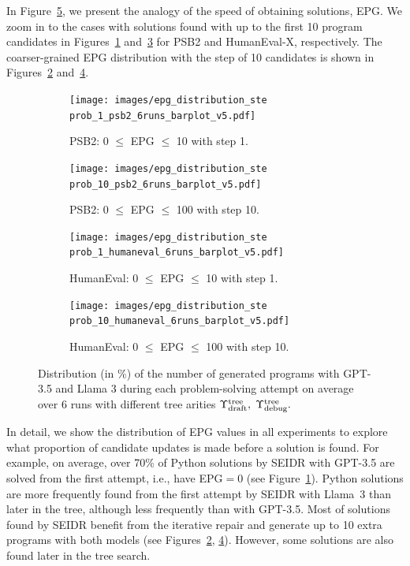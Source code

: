 In Figure~\ref{fig:epg-distribution}, we present the analogy of the speed of obtaining solutions, EPG. 
We zoom in to the cases with solutions found with up to the first 10 program candidates in Figures~\ref{fig:psb2-epg-distrib-step-1} and~\ref{fig:humaneval-epg-distrib-step-1} for PSB2 and HumanEval-X, respectively. 
The coarser-grained EPG distribution with the step of 10 candidates is shown in Figures~\ref{fig:psb2-epg-distrib-step-10} and~\ref{fig:humaneval-epg-distrib-step-10}. 


\begin{figure}
\begin{subfigure}{\columnwidth}
\centering
\texttt{[image: images/epg\_distribution\_ste\\prob\_1\_psb2\_6runs\_barplot\_v5.pdf]}
  \caption{PSB2: 0 $\leq$ EPG $\leq$ 10 with step 1.}
  \label{fig:psb2-epg-distrib-step-1}
\end{subfigure}
% 
% 
\begin{subfigure}{\columnwidth}
\centering
\texttt{[image: images/epg\_distribution\_ste\\prob\_10\_psb2\_6runs\_barplot\_v5.pdf]}
  \caption{PSB2: 0 $\leq$ EPG $\leq$ 100 with step 10.}
  \label{fig:psb2-epg-distrib-step-10}
\end{subfigure}
% 
\begin{subfigure}{\columnwidth}
\centering
\texttt{[image: images/epg\_distribution\_ste\\prob\_1\_humaneval\_6runs\_barplot\_v5.pdf]}
  \caption{HumanEval: 0 $\leq$ EPG $\leq$ 10 with step 1.}
  \label{fig:humaneval-epg-distrib-step-1}
\end{subfigure}
% 
\begin{subfigure}{\columnwidth}
\centering
\texttt{[image: images/epg\_distribution\_ste\\prob\_10\_humaneval\_6runs\_barplot\_v5.pdf]}
  \caption{HumanEval: 0 $\leq$ EPG $\leq$ 100 with step 10.}
  \label{fig:humaneval-epg-distrib-step-10}
\end{subfigure}
\caption{Distribution (in \%) of the number of generated programs with GPT-3.5 and Llama 3 during each problem-solving attempt on average over 6 runs with different tree arities $\Upsilon^\text{tree}_\text{draft}, \; \Upsilon^\text{tree}_\text{debug}.$}
\label{fig:epg-distribution}
\end{figure}



In detail, we show the distribution of EPG values in all experiments to explore what proportion of candidate updates is made before a solution is found.
For example, on average, over 70\% of Python solutions by SEIDR with GPT-3.5 are solved from the first attempt, i.e., have EPG$=0$ (see Figure~\ref{fig:psb2-epg-distrib-step-1}).
Python solutions are more frequently found from the first attempt by SEIDR with Llama~3 than later in the tree, although less frequently than with GPT-3.5.
Most of solutions found by SEIDR benefit from the iterative repair and generate up to 10 extra programs with both models (see Figures~\ref{fig:psb2-epg-distrib-step-10}, \ref{fig:humaneval-epg-distrib-step-10}). 
However, some solutions are also found later in the tree search. 

